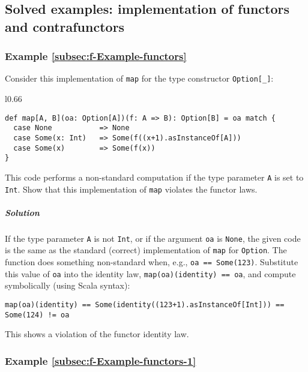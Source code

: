 \subsection{Solved examples: implementation of functors and contrafunctors}

\subsubsection{Example \label{subsec:f-Example-functors}\ref{subsec:f-Example-functors}}

Consider this implementation of \lstinline!map! for the type constructor
\lstinline!Option[_]!:

\begin{wrapfigure}{l}{0.66\columnwidth}%
\vspace{-0.85\baselineskip}
\begin{lstlisting}
def map[A, B](oa: Option[A])(f: A => B): Option[B] = oa match {
  case None           => None
  case Some(x: Int)   => Some(f((x+1).asInstanceOf[A]))
  case Some(x)        => Some(f(x))
}
\end{lstlisting}

\vspace{-1\baselineskip}
\end{wrapfigure}%

\noindent This code performs a non-standard computation if the type
parameter \lstinline!A! is set to \lstinline!Int!. Show that this
implementation of \lstinline!map! violates the functor laws.

\subparagraph{Solution}

If the type parameter \lstinline!A! is not \lstinline!Int!, or if
the argument \lstinline!oa! is \lstinline!None!, the given code
is the same as the standard (correct) implementation of \lstinline!map!
for \lstinline!Option!. The function does something non-standard
when, e.g., \lstinline!oa == Some(123)!. Substitute this value of
\lstinline!oa! into the identity law, \lstinline!map(oa)(identity) == oa!,
and compute symbolically (using Scala syntax):
\begin{lstlisting}
map(oa)(identity) == Some(identity((123+1).asInstanceOf[Int])) == Some(124) != oa
\end{lstlisting}
This shows a violation of the functor identity law.

\subsubsection{Example \label{subsec:f-Example-functors-1}\ref{subsec:f-Example-functors-1}}

